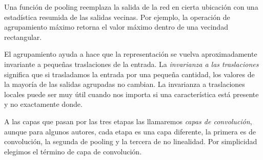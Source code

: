 \begin{remark}
Una función de pooling reemplaza la salida de la red en cierta
ubicación con una estadística resumida de las salidas vecinas.
Por ejemplo, la operación de agrupamiento máximo
retorna el valor máximo dentro de una vecindad rectangular.
\end{remark}


El agrupamiento ayuda a hace que la representación se vuelva 
aproximadamente invariante a pequeñas traslaciones de
la entrada. La \textit{invarianza a las traslaciones} significa 
que si trasladamos la entrada por una pequeña cantidad, los
valores de la mayoría de las salidas agrupadas no cambian.
La invarianza a traslaciones locales puede ser muy útil cuando
nos importa si una característica está presente y no 
exactamente donde.

A las capas que pasan por las tres etapas las llamaremos \textit{capas
de convolución}, aunque para algunos autores, cada etapa es una capa
diferente, la primera es de convolución, la segunda de pooling y la 
tercera de no linealidad. Por simplicidad elegimos el término
de capa de convolución.







